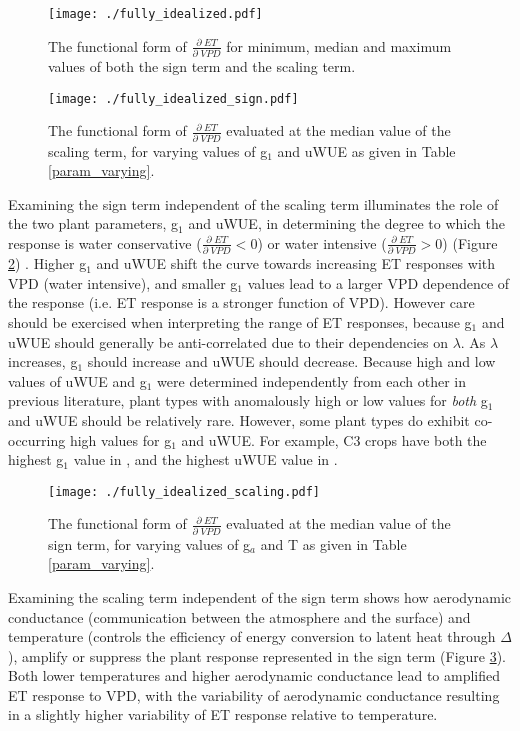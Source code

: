 \documentclass[draft]{agujournal2019}
\begin{document}
\begin{figure}
  \centering \texttt{[image: ./fully\_idealized.pdf]}
  \caption{The functional form of $\frac{\partial \; ET}{\partial
      \; VPD}$ for minimum, median and maximum values of both the sign
    term and the scaling term.}
  \label{full}
\end{figure}

\begin{figure}
  \centering \texttt{[image: ./fully\_idealized\_sign.pdf]}
  \caption{The functional form of $\frac{\partial \; ET}{\partial
      \; VPD}$ evaluated at the median value of the scaling term, for
    varying values of g$_1$ and uWUE as given in Table \ref{param_varying}.}
  \label{sign}
\end{figure}

Examining the sign term independent of the scaling term illuminates
the role of the two plant parameters, g$_1$ and uWUE, in determining
the degree to which the response is water conservative
($\frac{\partial \; ET}{\partial \; VPD} < 0$) or water intensive
($\frac{\partial \; ET}{\partial \; VPD} > 0$) (Figure \ref{sign})
. Higher g$_1$ and uWUE shift the curve towards increasing ET
responses with VPD (water intensive), and smaller g$_1$ values lead to
a larger VPD dependence of the response (i.e. ET response is a
stronger function of VPD). However care should be exercised when
interpreting the range of ET responses, because g$_1$ and uWUE should
generally be anti-correlated due to their dependencies on
$\lambda$. As $\lambda$ increases, g$_1$ should increase and uWUE
should decrease. Because high and low values of uWUE and g$_1$ were
determined independently from each other in previous literature, plant
types with anomalously high or low values for \textit{both} g$_1$ and
uWUE should be relatively rare. However, some plant types do exhibit
co-occurring high values for g$_1$ and uWUE. For example, C3 crops
have both the highest g$_1$ value in , and the
highest uWUE value in .

\begin{figure}
  \centering \texttt{[image: ./fully\_idealized\_scaling.pdf]}
  \caption{The functional form of $\frac{\partial \; ET}{\partial
      \; VPD}$ evaluated at the median value of the sign term, for
    varying values of g$_a$ and T as given in Table \ref{param_varying}.}
  \label{scaling}
\end{figure}

Examining the scaling term independent of the sign term shows how
aerodynamic conductance (communication between the atmosphere and the
surface) and temperature (controls the efficiency of energy conversion
to latent heat through $\Delta$), amplify or suppress the plant
response represented in the sign term (Figure \ref{scaling}). Both
lower temperatures and higher aerodynamic conductance lead to
amplified ET response to VPD, with the variability of aerodynamic
conductance resulting in a slightly higher variability of ET response
relative to temperature.
\end{document}
